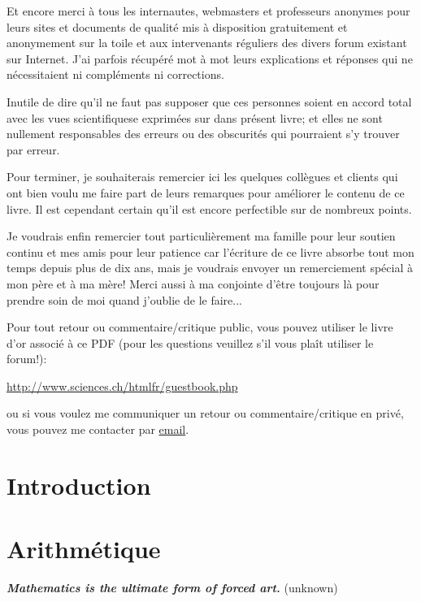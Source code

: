 \documentclass[12pt,a4paper,twoside,openright]{report}
\theoremstyle{definition}
\theoremstyle{itexmp}
\numberwithin{equation}{section}
\begin{document}
	Et encore merci à tous les internautes, webmasters et professeurs anonymes pour leurs sites et documents de qualité mis à disposition gratuitement et anonymement sur la toile et aux intervenants réguliers des divers forum existant sur Internet. J'ai parfois récupéré mot à mot leurs explications et réponses qui ne nécessitaient ni compléments ni corrections.

	Inutile de dire qu'il ne faut pas supposer que ces personnes soient en accord total avec les vues scientifiquese exprimées sur dans présent livre; et elles ne sont nullement responsables des erreurs ou des obscurités qui pourraient s'y trouver par erreur.

	Pour terminer, je souhaiterais remercier ici les quelques collègues et clients qui ont bien voulu me faire part de leurs remarques pour améliorer le contenu de ce livre. Il est cependant certain qu'il est encore perfectible sur de nombreux points.
	
	Je voudrais enfin remercier tout particulièrement ma famille pour leur soutien continu et mes amis pour leur patience car l'écriture de ce livre absorbe tout mon temps depuis plus de dix ans, mais je voudrais envoyer un remerciement spécial à mon père et à ma mère! Merci aussi à ma conjointe d'être toujours là pour prendre soin de moi quand j'oublie de le faire...
	
	Pour tout retour ou commentaire/critique public, vous pouvez utiliser le livre d'or associé à ce PDF (pour les questions veuillez s'il vous plaît utiliser le forum!):
	\begin{center}
	\url{http://www.sciences.ch/htmlfr/guestbook.php}
	\end{center}
	ou si vous voulez me communiquer un retour ou commentaire/critique en privé, vous pouvez me contacter par {\href{mailto:info@sciences.ch}{{\color{blue}email}}}.
	
  \chapter{Introduction}
	
	\minitoc
	\pagebreak
	
	

 \chapter{Arithmétique}

	\textit{\textbf{Mathematics is the ultimate form of forced art.}} (unknown)
	\minitoc
	
	
\end{document}
